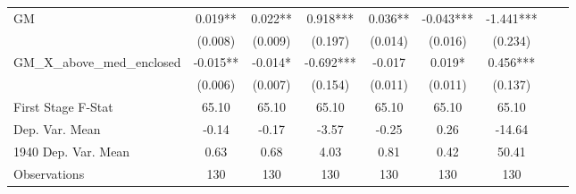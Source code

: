 \begin{tabular}{l*{8}{c}}
\cmidrule(lr){1-7}
GM              &    0.019** &    0.022** &    0.918***&    0.036** &   -0.043***&   -1.441***\\
                &  (0.008)   &  (0.009)   &  (0.197)   &  (0.014)   &  (0.016)   &  (0.234)   \\
\addlinespace
GM\_X\_above\_med\_enclosed&   -0.015** &   -0.014*  &   -0.692***&   -0.017   &    0.019*  &    0.456***\\
                &  (0.006)   &  (0.007)   &  (0.154)   &  (0.011)   &  (0.011)   &  (0.137)   \\
\midrule
First Stage F-Stat&    65.10   &    65.10   &    65.10   &    65.10   &    65.10   &    65.10   \\
Dep. Var. Mean  &    -0.14   &    -0.17   &    -3.57   &    -0.25   &     0.26   &   -14.64   \\
1940 Dep. Var. Mean&     0.63   &     0.68   &     4.03   &     0.81   &     0.42   &    50.41   \\
Observations    &      130   &      130   &      130   &      130   &      130   &      130   \\
       \bottomrule \end{tabular}
